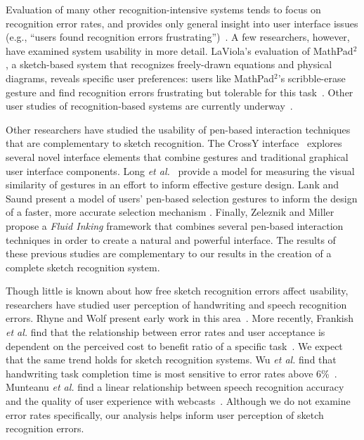 \documentclass{elsart}
\begin{document}
Evaluation of many other recognition-intensive systems tends to focus
on recognition error rates, and provides only general insight into
user interface issues (e.g., ``users found recognition errors
frustrating'')~\cite{Alvarado2001Preserving,Gennari2005Combining,Hammond2002Tahuti}.
A few researchers, however, have examined system usability in more
detail.  LaViola's evaluation of MathPad$^{2}$, a sketch-based system
that recognizes freely-drawn equations and physical diagrams, reveals
specific user preferences: users like MathPad$^{2}$'s scribble-erase
gesture and find recognition errors frustrating but tolerable for this
task~\cite{LaViola2006Initial}.  Other user studies of
recognition-based systems are currently
underway~\cite{Koile2007Supporting,Tenneson2005ChemPad}.


Other researchers have studied the usability of pen-based interaction
techniques that are complementary to sketch recognition.  The CrossY
interface~\cite{Apitz04CrossY} explores several novel interface
elements that combine gestures and traditional graphical user
interface components.  Long \textit{et
al.}~\cite{Long00VisualSimilarity} provide a model for measuring the
visual similarity of gestures in an effort to inform effective gesture
design.  Lank and Saund present a model of users' pen-based selection
gestures to inform the design of a faster, more accurate selection
mechanism \cite{Lank2005Sloppy}.  Finally, Zeleznik and Miller propose
a \textit{Fluid Inking} framework that combines several pen-based
interaction techniques in order to create a natural and powerful
interface\cite{Zeleznik2006Fluid}.  The results of these previous
studies are complementary to our results in the creation of a complete
sketch recognition system.

Though little is known about how free sketch recognition
errors affect usability, researchers have studied user perception of
handwriting and speech recognition errors.  Rhyne and Wolf present
early work in this area~\cite{Rhyne1993Recognition}.  More recently,
Frankish \textit{et al.} find that the relationship between error
rates and user acceptance is dependent on the perceived cost to
benefit ratio of a specific task~\cite{Frankish95RecogAccuracy}.  We
expect that the same trend holds for sketch recognition systems.  Wu
\textit{et al.}  find that handwriting task completion time is most
sensitive to error rates above 6\%~\cite{Wu03ChineseCharacterRecog}.
Munteanu \textit{et al.} find a linear relationship between speech
recognition accuracy and the quality of user experience with
webcasts~\cite{Munteanu2006Effect}.  Although we do not examine error
rates specifically, our analysis helps inform user perception of
sketch recognition errors.
\end{document}
